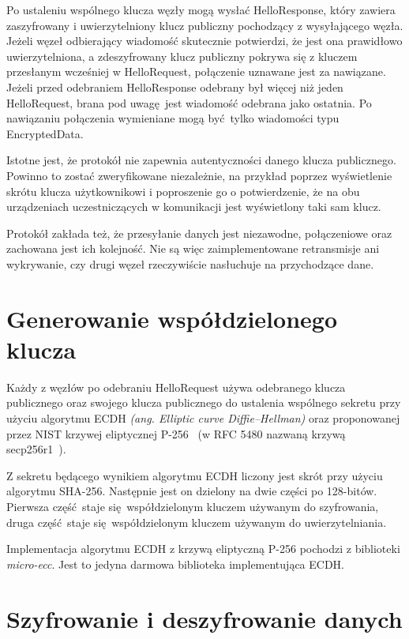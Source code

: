 Po ustaleniu wspólnego klucza węzły mogą wysłać HelloResponse, który zawiera zaszyfrowany i uwierzytelniony klucz publiczny pochodzący z wysyłającego węzła. Jeżeli węzeł odbierający wiadomość skutecznie potwierdzi, że jest ona prawidłowo uwierzytelniona, a zdeszyfrowany klucz publiczny pokrywa się z kluczem przesłanym wcześniej w HelloRequest, połączenie uznawane jest za nawiązane. Jeżeli przed odebraniem HelloResponse odebrany był więcej niż jeden HelloRequest, brana pod uwagę jest wiadomość odebrana jako ostatnia. Po nawiązaniu połączenia wymieniane mogą być tylko wiadomości typu EncryptedData.

Istotne jest, że protokół nie zapewnia autentyczności danego klucza publicznego. Powinno to zostać zweryfikowane niezależnie, na przykład poprzez wyświetlenie skrótu klucza użytkownikowi i poproszenie go o potwierdzenie, że na obu urządzeniach uczestniczących w komunikacji jest wyświetlony taki sam klucz.

Protokół zakłada też, że przesyłanie danych jest niezawodne, połączeniowe oraz zachowana jest ich kolejność. Nie są więc zaimplementowane retransmisje ani wykrywanie, czy drugi węzeł rzeczywiście nasłuchuje na przychodzące dane.

\section{Generowanie współdzielonego klucza}
\label{sec:sharedkey}

Każdy z węzłów po odebraniu HelloRequest używa odebranego klucza publicznego oraz swojego klucza publicznego do ustalenia wspólnego sekretu przy użyciu algorytmu ECDH \emph{(ang. Elliptic curve Diffie--Hellman)} oraz proponowanej przez NIST krzywej eliptycznej P-256~\cite{kerry2013digital} (w RFC 5480 nazwaną krzywą secp256r1~\cite{turner2009elliptic}).

Z sekretu będącego wynikiem algorytmu ECDH liczony jest skrót przy użyciu algorytmu SHA-256. Następnie jest on dzielony na dwie części po 128-bitów. Pierwsza część staje się współdzielonym kluczem używanym do szyfrowania, druga część staje się współdzielonym kluczem używanym do uwierzytelniania.

Implementacja algorytmu ECDH z krzywą eliptyczną P-256 pochodzi z biblioteki \emph{micro-ecc}. Jest to jedyna darmowa biblioteka implementująca ECDH.

\section{Szyfrowanie i deszyfrowanie danych}
\label{sec:encrypt}

